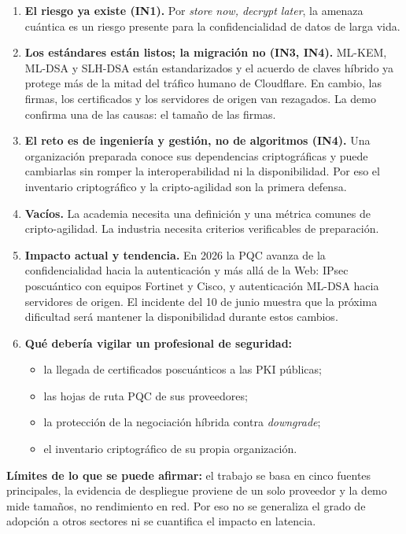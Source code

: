 \begin{enumerate}[leftmargin=*]
  \item \textbf{El riesgo ya existe (IN1).} Por \textit{store now, decrypt later}, la amenaza cuántica es un riesgo presente para la confidencialidad de datos de larga vida.
  \item \textbf{Los estándares están listos; la migración no (IN3, IN4).} ML-KEM, ML-DSA y SLH-DSA están estandarizados y el acuerdo de claves híbrido ya protege más de la mitad del tráfico humano de Cloudflare. En cambio, las firmas, los certificados y los servidores de origen van rezagados. La demo confirma una de las causas: el tamaño de las firmas.
  \item \textbf{El reto es de ingeniería y gestión, no de algoritmos (IN4).} Una organización preparada conoce sus dependencias criptográficas y puede cambiarlas sin romper la interoperabilidad ni la disponibilidad. Por eso el inventario criptográfico y la cripto-agilidad son la primera defensa.
  \item \textbf{Vacíos.} La academia necesita una definición y una métrica comunes de cripto-agilidad. La industria necesita criterios verificables de preparación.
  \item \textbf{Impacto actual y tendencia.} En 2026 la PQC avanza de la confidencialidad hacia la autenticación y más allá de la Web: IPsec poscuántico con equipos Fortinet y Cisco, y autenticación ML-DSA hacia servidores de origen. El incidente del 10 de junio muestra que la próxima dificultad será mantener la disponibilidad durante estos cambios.
  \item \textbf{Qué debería vigilar un profesional de seguridad:}
  \begin{itemize}
    \item la llegada de certificados poscuánticos a las PKI públicas;
    \item las hojas de ruta PQC de sus proveedores;
    \item la protección de la negociación híbrida contra \textit{downgrade};
    \item el inventario criptográfico de su propia organización.
  \end{itemize}
\end{enumerate}

\textbf{Límites de lo que se puede afirmar:} el trabajo se basa en cinco fuentes principales, la evidencia de despliegue proviene de un solo proveedor y la demo mide tamaños, no rendimiento en red. Por eso no se generaliza el grado de adopción a otros sectores ni se cuantifica el impacto en latencia.
